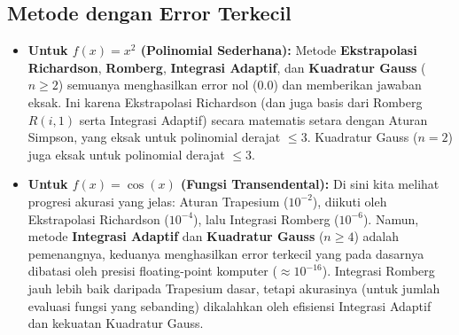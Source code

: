 \documentclass[a4paper, 11pt]{article} %
\begin{document}
\subsection{Metode dengan Error Terkecil} %
\begin{itemize}
    \item \textbf{Untuk $f(x) = x^2$ (Polinomial Sederhana):} %
    Metode \textbf{Ekstrapolasi Richardson}, \textbf{Romberg}, \textbf{Integrasi Adaptif}, dan \textbf{Kuadratur Gauss} ($n \ge 2$) semuanya menghasilkan error nol (0.0) dan memberikan jawaban eksak. %
    Ini karena Ekstrapolasi Richardson (dan juga basis dari Romberg $R(i,1)$ serta Integrasi Adaptif) secara matematis setara dengan Aturan Simpson, yang eksak untuk polinomial derajat $\le 3$. %
    Kuadratur Gauss ($n=2$) juga eksak untuk polinomial derajat $\le 3$. %
    
    \item \textbf{Untuk $f(x) = \cos(x)$ (Fungsi Transendental):} %
    Di sini kita melihat progresi akurasi yang jelas: Aturan Trapesium ($10^{-2}$), diikuti oleh Ekstrapolasi Richardson ($10^{-4}$), lalu Integrasi Romberg ($10^{-6}$).
    Namun, metode \textbf{Integrasi Adaptif} dan \textbf{Kuadratur Gauss} ($n \ge 4$) adalah pemenangnya, keduanya menghasilkan error terkecil yang pada dasarnya dibatasi oleh presisi floating-point komputer ($\approx 10^{-16}$). %
    Integrasi Romberg jauh lebih baik daripada Trapesium dasar, tetapi akurasinya (untuk jumlah evaluasi fungsi yang sebanding) dikalahkan oleh efisiensi Integrasi Adaptif dan kekuatan Kuadratur Gauss. %
\end{itemize}
\end{document}
